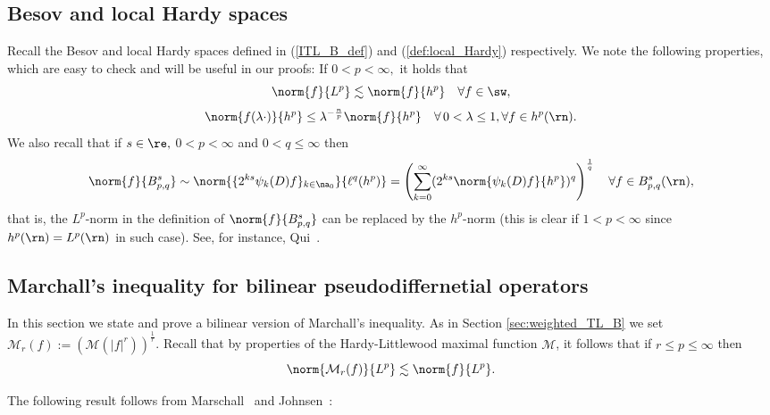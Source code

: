 \subsection{Besov and local Hardy spaces}
Recall the Besov and local Hardy spaces defined in (\ref{ITL_B_def}) and (\ref{def:local_Hardy}) respectively. 
We note the following properties, which are easy to check and will be useful in our proofs: If $0<p<\infty,$  it holds that
\begin{equation}\label{eq:Lp:hp}
\norm{f}{L^p}\lesssim \norm{f}{h^p}\quad\forall f\in \sw, 
\end{equation}
\begin{equation}\label{eq:hp:scale}
\norm{f(\lambda\cdot)}{h^p}\le \lambda^{-\frac{n}{p}}\norm{f}{h^p}\quad \forall\, 0<\lambda\le 1,\forall f\in h^p(\rn). 
\end{equation}
We also recall that if $s\in \re,$ $0<p<\infty$ and  $0<q\le \infty$ then 
\begin{equation}\label{eq:besovlh}
\norm{f}{B^s_{p,q}}\sim \norm{\{2^{ks}\psi_k(D)f\}_{k\in\na_0}}{\ell^q(h^p)} =\left(\sum_{k=0}^\infty (2^{ks} \norm{\psi_k(D)f}{h^p})^q\right)^{\frac{1}{q}}\quad \forall f\in B^s_{p,q}(\rn),
\end{equation}
that is, the $L^p$-norm in the definition of $\norm{f}{B^s_{p,q}}$ can be replaced by the $h^p$-norm (this is clear if $1<p<\infty$ since $h^p(\rn)=L^p(\rn)$ in such case). See, for instance, Qui~\cite[Corollary 2.3]{MR676560}.

\subsection{Marchall's inequality for bilinear pseudodiffernetial operators}
In this section we state and prove a bilinear version of Marchall's inequality. As in Section \ref{sec:weighted_TL_B} we set $\mathcal{M}_r (f) := \left(\mathcal{M}(|f|^r)\right)^{\frac{1}{r}}$. Recall that by properties of the Hardy-Littlewood maximal function $\mathcal{M}$, it follows that if $r\leq p\leq \infty$ then 
\begin{equation}\label{eq:Mtau:in:Lp}
\norm{\mathcal{M}_r(f)}{L^p} \lesssim \norm{f}{L^p}.
\end{equation}

The following result follows from   Marschall~\cite[p.118, Proposition 5(a)]{MR1376592} and  Johnsen~\cite[p.275, Proposition 4.1]{MR2163627}:

